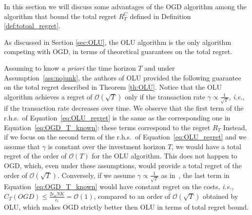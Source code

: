 In this section we will discuss some advantages of the OGD algorithm among the algorithm that bound the total regret $R_T^C$ defined in Definition \ref{def:totoal_regret}.

As discussed in Section \ref{sec:OLU}, the OLU algorithm is the only algorithm competing with OGD, in terms of theoretical guarantees on the total regret.

Assuming to know \emph{a priori} the time horizon $T$ and under Assumption~\ref{ass:nojunk}, the authors of OLU provided the following guarantee on the total regret described in Theorem \ref{th:OLU}.
Notice that the OLU algorithm achieves a regret of $\mathcal{O}(\sqrt T)$ only if the transaction rate $\gamma \propto \frac{1}{\sqrt{T}}$, \emph{i.e.}, if the transaction rate decreases over time.
We observe that the first term of the r.h.s.~of Equation~\eqref{eq:OLU_regret} is the same as the corresponding one in Equation~\eqref{eq:OGD_T_known}: these terms correspond to the regret $R_T$
Instead, if we focus on the second term of the r.h.s.~of Equation~\eqref{eq:OLU_regret} and we assume that $\gamma$ is constant over the investment horizon $T$, we would have a total regret of the order of $\mathcal{O}(T)$ for the OLU algorithm.
This does not happen to OGD, which, even under these assumptions, would provide a total regret of the order of $\mathcal{O}(\sqrt{T})$.
Conversely, if we assume $\gamma \propto \frac{1}{\sqrt{T}}$ as in~\cite{das2013online}, the last term in Equation~\eqref{eq:OGD_T_known} would have constant regret on the costs, \emph{i.e.}, $C_T(OGD)\le\frac{2 \epsilon_u N K}{\epsilon_l} = \mathcal{O}(1)$, compared to an order of $ \mathcal{O}(\sqrt{T})$ obtained by OLU, which makes OGD strictly better then OLU in terms of total regret bound.



